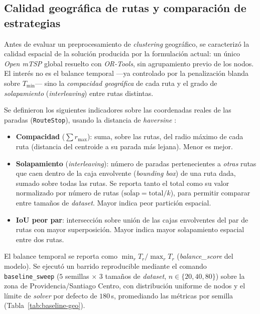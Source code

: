 \subsection{Calidad geográfica de rutas y comparación de estrategias}
\label{sec:comparacion-estrategias}

Antes de evaluar un preprocesamiento de \textit{clustering} geográfico, se
caracterizó la calidad espacial de la solución producida por la formulación
actual: un único \textit{Open mTSP} global resuelto con \textit{OR-Tools}, sin
agrupamiento previo de los nodos. El interés no es el balance temporal ---ya
controlado por la penalización blanda sobre $T_{\min}$--- sino la
\textit{compacidad geográfica} de cada ruta y el grado de
\textit{solapamiento} (\textit{interleaving}) entre rutas distintas.

Se definieron los siguientes indicadores sobre las coordenadas reales de las
paradas (\texttt{RouteStop}), usando la distancia de \textit{haversine}
\citep{sinnott1984virtues}:

\begin{itemize}
  \item \textbf{Compacidad} ($\sum r_{\max}$): suma, sobre las rutas, del radio
  máximo de cada ruta (distancia del centroide a su parada más lejana). Menor es mejor.
  \item \textbf{Solapamiento} (\textit{interleaving}): número de paradas
  pertenecientes a \textit{otras} rutas que caen dentro de la caja envolvente
  (\textit{bounding box}) de una ruta dada, sumado sobre todas las rutas. Se
  reporta tanto el total como su valor normalizado por número de rutas
  ($\overline{\text{solap}} = \text{total}/k$), para permitir comparar entre
  tamaños de \textit{dataset}. Mayor indica peor partición espacial.
  \item \textbf{IoU peor par}: intersección sobre unión de las cajas
  envolventes del par de rutas con mayor superposición. Mayor indica mayor
  solapamiento espacial entre dos rutas.
\end{itemize}

El balance temporal se reporta como $\min_r T_r / \max_r T_r$
(\textit{balance\_score} del modelo). Se ejecutó un barrido reproducible
mediante el comando \texttt{baseline\_sweep} ($5$ semillas $\times$ $3$ tamaños
de \textit{dataset}, $n \in \{20, 40, 80\}$) sobre la zona de Providencia/Santiago
Centro, con distribución uniforme de nodos y el límite de \textit{solver} por defecto de
$180$\,s, promediando las métricas por semilla (Tabla~\ref{tab:baseline-geo}).

